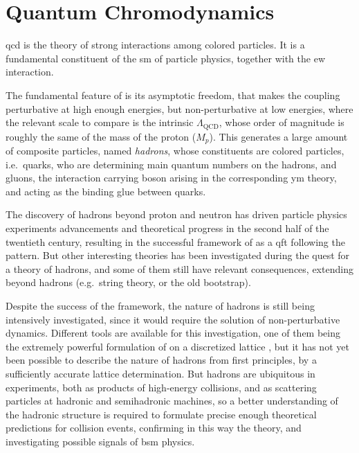 
\chapter{Quantum Chromodynamics}
\label{ch:qcd}
\minitoc
\adjustmtc
\bigskip

\acrfull{qcd} is the theory of strong interactions among colored particles.
It is a fundamental constituent of the \acrfull{sm} of particle physics,
together with the \acrfull{ew} interaction.

The fundamental feature of \qcd is its asymptotic freedom, that makes the
coupling perturbative at high enough energies, but non-perturbative at low
energies, where the relevant scale to compare is the intrinsic
$\Lambda_{\text{QCD}}$, whose order of magnitude is roughly the same of the
mass of the proton ($M_p$).
%
This generates a large amount of composite particles, named \textit{hadrons},
whose constituents are colored particles, i.e.\ quarks, who are determining
main quantum numbers on the hadrons, and gluons, the interaction carrying boson
arising in the corresponding \acrfull{ym} theory, and acting as the binding
glue between quarks.

The discovery of hadrons beyond proton and neutron has driven particle physics
experiments advancements and theoretical progress in the second half of the
twentieth century, resulting in the successful framework of \qcd as a
\acrlong{qft} following the \ym pattern.
But other interesting theories has been investigated during the quest for a
theory of hadrons, and some of them still have relevant consequences, extending
beyond hadrons (e.g.\ string theory, or the old bootstrap).

Despite the success of the framework, the nature of hadrons is still being
intensively investigated, since it would require the solution of
non-perturbative \qcd dynamics.
%
Different tools are available for this investigation, one of them being the
extremely powerful formulation of \qcd on a discretized lattice
\cite{Wilson:1974sk}, but it has not yet been possible to describe the nature
of hadrons from first principles, by a sufficiently accurate lattice
determination.
%
But hadrons are ubiquitous in \hep experiments, both as products of high-energy
collisions, and as scattering particles at hadronic and semihadronic machines,
so a better understanding of the hadronic structure is required to formulate
precise enough theoretical predictions for collision events, confirming in this
way the \sm theory, and investigating possible signals of \acrfull{bsm}
physics.

